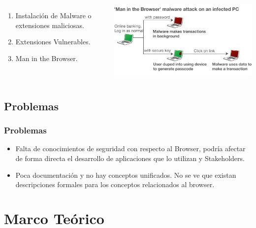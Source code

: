 \documentclass[serif,9pt]{beamer}
\begin{document}
\begin{frame}
\begin{columns}
\begin{minipage}[c][0.4\textheight][c]{\linewidth}
	  \begin{enumerate}
	  \item Instalaci\'on de Malware o extensiones maliciosas.
	  \item Extensiones Vulnerables.
	  \item Man in the Browser.
	  \end{enumerate}
	\end{minipage}
	\begin{minipage}[c][0.4\textheight][c]{\linewidth}
	  \centering
	  \includegraphics[scale=0.45]{figures/_58291188_malware_464v2.jpg}
	\end{minipage}
	\end{columns}
\end{frame}

\subsection{Problemas}
\begin{frame}
	\frametitle{Problemas}
	\begin{itemize}
		\item Falta de conocimientos de seguridad con respecto al Browser, podr\'ia afectar de forma directa el desarrollo de aplicaciones que lo utilizan y Stakeholders. 
		\item Poca documentaci\'on y no hay conceptos unificados. No se ve que existan descripciones formales para los conceptos relacionados al browser.
	\end{itemize}
\end{frame}

\section{Marco Teórico}
\end{document}
